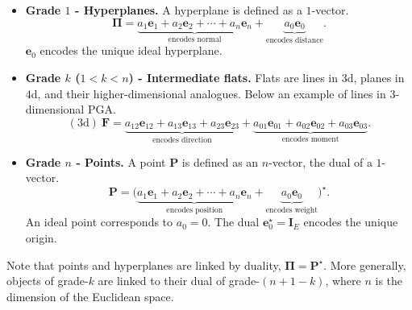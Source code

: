 \documentclass{birkjour}
\theoremstyle{definition}
\theoremstyle{remark}
\begin{document}
\begin{itemize}
  \item \textbf{Grade $1$ - Hyperplanes.}
    A hyperplane is defined as a $1$-vector.
    \begin{equation}
    \boldsymbol{\Pi} = \underbrace{a_1\mathbf{e}_1 + a_2\mathbf{e}_2 + \cdots + a_n\mathbf{e}_n}_{\text{encodes normal}}
     + \underbrace{a_0 \mathbf{e}_0}_{\text{encodes distance}}.
   \end{equation}
   $\mathbf{e}_0$ encodes the unique ideal hyperplane. 

  \item \textbf{Grade $k$ ($1 < k < n$) - Intermediate flats.}
    Flats are lines in $3$d, planes in $4$d, and their higher-dimensional analogues. Below an example of lines in $3$-dimensional PGA.
    \begin{equation}
    (3\text{d})~ \mathbf{F} = \underbrace{a_{12}\mathbf{e}_{12} + a_{13}\mathbf{e}_{13}+ a_{23}\mathbf{e}_{23}}_{\text{encodes direction}}
     + \underbrace{a_{01} \mathbf{e}_{01} + a_{02} \mathbf{e}_{02} + a_{03} \mathbf{e}_{03}}_{\text{encodes moment}}.
   \end{equation}
   
  \item \textbf{Grade $n$ - Points.}
    A point $\mathbf{P}$ is defined as an $n$-vector, the dual of a $1$-vector.
    \begin{equation}
    \mathbf{P} = \big(\underbrace{a_1\mathbf{e}_1 + a_2\mathbf{e}_2 + \cdots + a_n\mathbf{e}_n}_{\text{encodes position}}
     + \underbrace{a_0 \mathbf{e}_0}_{\text{encodes weight}}\big)^\star.
   \end{equation}
    An ideal point corresponds to $a_0 = 0$. The dual $\mathbf{e}_0^\star = \mathbf{I}_E$ encodes the unique origin.
\end{itemize}
Note that points and hyperplanes are linked by duality, $\boldsymbol{\Pi} = \mathbf{P}^\star$. More generally, objects of grade-$k$ are linked to their dual of grade-$(n+1-k)$, where $n$ is the dimension of the Euclidean space.
\end{document}
